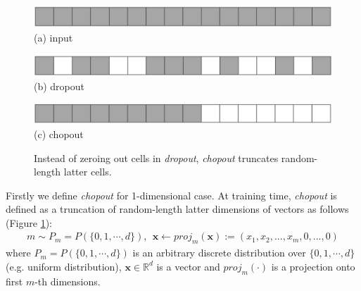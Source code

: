\documentclass{article}
\begin{document}
    \begin{figure}
    \begin{minipage}{0.33\linewidth}
      \begin{center}
        \includegraphics[scale=0.13]{input.png}
        \hspace{1.6cm} (a) input
      \end{center}
    \end{minipage}
    \begin{minipage}{0.33\linewidth}
      \begin{center}
        \includegraphics[scale=0.13]{dropout_applied}
        \hspace{1.6cm} (b) dropout
      \end{center}
    \end{minipage}
    \begin{minipage}{0.33\linewidth}
      \begin{center}
        \includegraphics[scale=0.13]{chopout_applied.png}
        \hspace{1.6cm} (c) chopout
      \end{center}
    \end{minipage}    
    \caption{Instead of zeroing out cells in \textit{dropout}, \textit{chopout} truncates random-length latter cells.}
    \label{fig:dropout_and_chopout}
    \end{figure}
    Firstly we define \textit{chopout} for 1-dimensional case.
    At training time, \textit{chopout} is defined as a truncation of random-length latter dimensions of vectors as follows (Figure \ref{fig:dropout_and_chopout}):
    \begin{align}
        m \sim P_m = P(\{0, 1, \cdots, d\}), \ \ 
        \mathbf{x} \leftarrow {proj}_m(\mathbf{x}) := (x_1, x_2, ..., x_m, 0, ..., 0) \nonumber
    \end{align}
    where $P_m = P(\{0, 1, \cdots, d\})$ is an arbitrary discrete distribution over $\{0, 1, \cdots, d\}$ (e.g. uniform distribution), $\mathbf{x} \in \mathbb{R}^d$ is a vector and ${proj}_m(\cdot)$ is a projection onto first $m$-th dimensions. 
\end{document}

